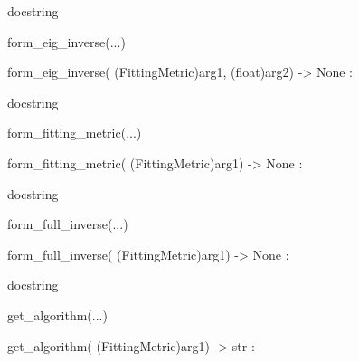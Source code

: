 \documentclass[letterpaper,10pt,english]{sphinxmanual}
\begin{document}
\begin{description}
\begin{description}
\begin{DUlineblock}{0em}
\begin{DUlineblock}{\DUlineblockindent}
\begin{DUlineblock}{\DUlineblockindent}
\item[] docstring
\item[] 
\end{DUlineblock}
\end{DUlineblock}
\item[] form\_eig\_inverse(...)
\item[]
\begin{DUlineblock}{\DUlineblockindent}
\item[] form\_eig\_inverse( (FittingMetric)arg1, (float)arg2) -\textgreater{} None :
\item[]
\begin{DUlineblock}{\DUlineblockindent}
\item[] docstring
\item[] 
\end{DUlineblock}
\end{DUlineblock}
\item[] form\_fitting\_metric(...)
\item[]
\begin{DUlineblock}{\DUlineblockindent}
\item[] form\_fitting\_metric( (FittingMetric)arg1) -\textgreater{} None :
\item[]
\begin{DUlineblock}{\DUlineblockindent}
\item[] docstring
\item[] 
\end{DUlineblock}
\end{DUlineblock}
\item[] form\_full\_inverse(...)
\item[]
\begin{DUlineblock}{\DUlineblockindent}
\item[] form\_full\_inverse( (FittingMetric)arg1) -\textgreater{} None :
\item[]
\begin{DUlineblock}{\DUlineblockindent}
\item[] docstring
\item[] 
\end{DUlineblock}
\end{DUlineblock}
\item[] get\_algorithm(...)
\item[]
\begin{DUlineblock}{\DUlineblockindent}
\item[] get\_algorithm( (FittingMetric)arg1) -\textgreater{} str :
\item[]
\begin{DUlineblock}{\DUlineblockindent}

\end{DUlineblock}
\end{DUlineblock}
\end{DUlineblock}
\end{description}
\end{description}
\end{document}
